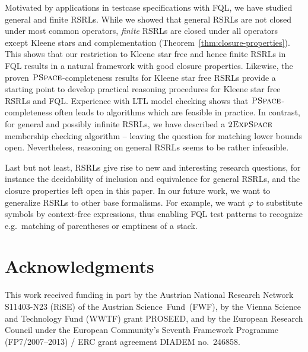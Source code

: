 \documentclass[envcountsame]{llncs}
\newcommand{\PSPACE}{\complexityclass{PSpace}}
\newcommand{\tEXPSPACE}{\complexityclass{2ExpSpace}}
\newcommand{\complexityclass}[1]{\ensuremath{\textsc{#1}}\xspace}
\newcommand{\RegularlyGeneratedLanguageSetsAbbrev}{RSRLs\xspace}
\newcommand{\FQL}{FQL\xspace}
\begin{document}
Motivated by applications in testcase specifications with FQL, we have
studied general and finite
\RegularlyGeneratedLanguageSetsAbbrev. While we showed that general
\RegularlyGeneratedLanguageSetsAbbrev are not closed under most common
operators, \emph{finite} \RegularlyGeneratedLanguageSetsAbbrev are
closed under all operators except Kleene stars and complementation
(Theorem~\ref{thm:closure-properties}).
This shows that our restriction to Kleene star free and hence finite
\RegularlyGeneratedLanguageSetsAbbrev in \FQL results in a natural
framework with good closure properties.
Likewise, the proven \PSPACE-completeness results for Kleene star free
\RegularlyGeneratedLanguageSetsAbbrev provide a starting point to
develop practical reasoning procedures for Kleene star free
\RegularlyGeneratedLanguageSetsAbbrev and \FQL.
Experience with LTL model checking shows that \PSPACE-completeness
often leads to algorithms which are feasible in practice.
In contrast, for general and possibly infinite
\RegularlyGeneratedLanguageSetsAbbrev, we have described a \tEXPSPACE
membership checking algorithm -- leaving the question for matching
lower bounds open.
Nevertheless, reasoning on general
\RegularlyGeneratedLanguageSetsAbbrev seems to be rather infeasible.



Last but not least, \RegularlyGeneratedLanguageSetsAbbrev give rise to new
and interesting research questions, for instance 
the decidability of inclusion and equivalence for general
\RegularlyGeneratedLanguageSetsAbbrev, and the closure properties left open in this paper.
In our future work, we want to generalize
\RegularlyGeneratedLanguageSetsAbbrev to other base formalisms.
For example, we want $\varphi$ to substitute symbols by context-free
expressions, thus enabling \FQL test patterns to recognize
e.g.~matching of parentheses or emptiness of a stack.  



 
\section*{Acknowledgments}
This work received funding in part by the Austrian National Research
Network S11403-N23 (RiSE) of the Austrian Science~Fund~(FWF), by the
Vienna Science and Technology Fund (WWTF) grant PROSEED, and by the
European Research Council under the European Community's Seventh
Framework Programme (FP7/2007--2013) / ERC grant agreement DIADEM
no.~246858.
\end{document}
